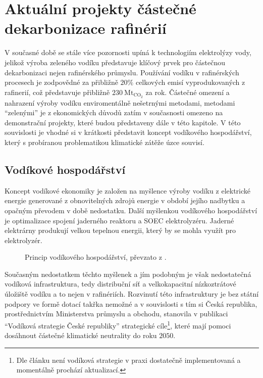 \chapter{Aktuální projekty částečné dekarbonizace rafinérií}

V současné době se stále více pozornosti upíná k technologiím elektrolýzy vody, jelikož výroba zeleného vodíku představuje klíčový prvek pro částečnou dekarbonizaci nejen rafinérského průmyslu. Používání vodíku v rafinérských procesech je zodpovědné za přibližně $20\%$ celkových emisí vyprodukovaných z rafinerií, což představuje přibližně $230\ \mathrm{Mt_{CO_2}}$ za rok. \cite{IEAfuture} Částečné omezení a nahrazení výroby vodíku enviromentálně nešetrnými metodami, metodami \enquote{zelenými} je z ekonomických důvodů zatím v současnosti omezeno na demonstrační projekty, které budou představeny dále v této kapitole. V této souvislosti je vhodné si v krátkosti představit koncept vodíkového hospodářství, který s probíranou problematikou klimatické zátěže úzce souvisí.

\section{Vodíkové hospodářství}

Koncept vodíkové ekonomiky je založen na myšlence výroby vodíku z elektrické energie generované z obnovitelných zdrojů energie v období jejího nadbytku a opačným převodem v době nedostatku. \cite{Tkac2017} Další myšlenkou vodíkového hospodářství je optimalizace spojení jaderného reaktoru a \acs{SOEC} elektrolyzéru. Jaderné elektrárny produkují velkou tepelnou energii, který by se mohla využít pro elektrolyzér. \cite{Tkac2017}
\begin{figure}[h]
    \centering
    
    \caption[Princip vodíkového hospodářství]{Princip vodíkového hospodářství, převzato z \cite{Grahame2018}.} \label{fig:vodikove_hospodarstvi}
\end{figure}

Současným nedostatkem těchto myšlenek a jím podobným je však nedostatečná vodíková infrastruktura, tedy distribuční síť a velkokapacitní nízkoztrátové úložiště vodíku a to nejen v rafinériích. \cite{Tkac2017} Rozvinutí této infrastruktury je bez státní podpory ve formě dotací takřka nemožné a v souvislosti s tím si Česká republika, prostřednictvím Ministerstva průmyslu a obchodu, stanovila v publikaci \enquote{Vodíková strategie
České republiky} \cite{VodikovaStrategie} strategické cíle\footnote{Dle článku \cite{Votruba2024} není vodíková strategie v praxi dostatečně implementovaná a momentálně prochází aktualizací.}, které mají pomoci dosáhnout částečné klimatické neutrality do roku $2050$.


